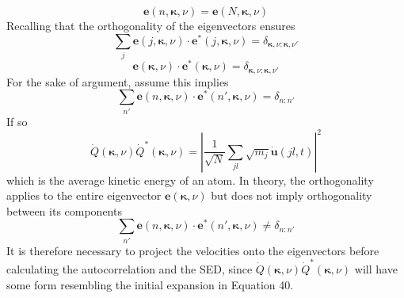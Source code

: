 \begin{equation}
\bm{e}(n,\bm{\kappa},\nu)=\bm{e}(N,\bm{\kappa},\nu)
\end{equation}
Recalling that the orthogonality of the eigenvectors ensures 
\begin{equation}
\sum_{j}\bm{e}(j,\bm{\kappa},\nu)\cdot\bm{e}^*(j,\bm{\kappa},\nu)= \delta_{\bm{\kappa},\nu:\bm{\kappa},\nu'}
\end{equation}
\begin{equation}
\bm{e}(\bm{\kappa},\nu)\cdot\bm{e}^*(\bm{\kappa},\nu)= \delta_{\bm{\kappa},\nu:\bm{\kappa},\nu'}
\end{equation}
For the sake of argument, assume this implies
\begin{equation}
\sum_{n'}\bm{e}(n,\bm{\kappa},\nu)\cdot\bm{e}^*(n',\bm{\kappa},\nu)=\delta_{n:n'}
\end{equation}
If so
\begin{equation}
\dot{Q}(\bm{\kappa},\nu)\dot{Q}^*(\bm{\kappa},\nu)=|\frac{1}{\sqrt{N}}\sum_{jl}\sqrt{m_j}\dot{\bm{u}}(jl,t)|^2
\end{equation}
which is the average kinetic energy of an atom. In theory, the orthogonality applies to the entire eigenvector $\bm{e}(\bm{\kappa},\nu)$ but does not imply orthogonality between its components
\begin{equation}
\sum_{n'}\bm{e}(n,\bm{\kappa},\nu)\cdot\bm{e}^*(n',\bm{\kappa},\nu)\neq\delta_{n:n'}
\end{equation}
It is therefore necessary to project the velocities onto the eigenvectors before calculating the autocorrelation and the SED, since $\dot{Q}(\bm{\kappa},\nu)\dot{Q}^*(\bm{\kappa},\nu)$ will have some form resembling the initial expansion in Equation 40.

